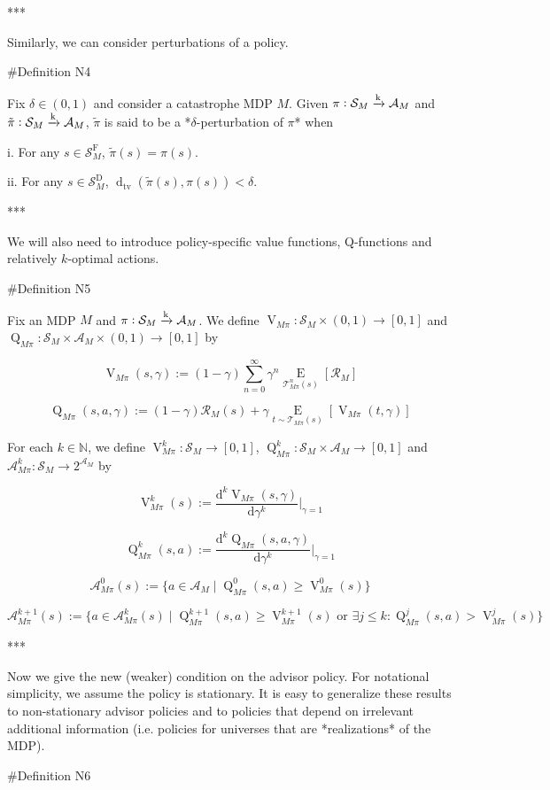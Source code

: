 \documentclass[a4paper]{article}
\newcommand{\AP}[1]{\left(#1\right)}
\newcommand{\AB}[1]{\left[#1\right]}
\newcommand{\Ea}[2]{\underset{#1}{\operatorname{E}}\AB{#2}}
\newcommand{\D}{\mathrm{d}}
\newcommand{\Dtva}[1]{\operatorname{d}_{\text{tv}}\AP{#1}}
\newcommand{\Nats}{\mathbb{N}}
\newcommand{\M}{\xrightarrow{\textnormal{k}}}
\newcommand{\A}{\mathcal{A}}
\newcommand{\St}{\mathcal{S}}
\newcommand{\T}{\mathcal{T}}
\newcommand{\R}{\mathcal{R}}
\newcommand{\SF}{\St^{\text{F}}}
\newcommand{\SD}{\St^{\text{D}}}
\newcommand{\V}{\operatorname{V}}
\newcommand{\Q}{\operatorname{Q}}
\begin{document}
***

Similarly, we can consider perturbations of a policy.

\#Definition N4

Fix $\delta\in(0,1)$ and consider a catastrophe MDP $M$. Given $\pi: \St_M \M \A_M$ and $\tilde{\pi}: \St_M \M \A_M$, $\tilde{\pi}$ is said to be a *$\delta$-perturbation of $\pi$* when

i. For any $s \in \SF_M$, $\tilde{\pi}(s) = \pi(s)$.

ii. For any $s \in \SD_M$, $\Dtva{\tilde{\pi}(s),\pi(s)} < \delta$.

***

We will also need to introduce policy-specific value functions, Q-functions and relatively $k$-optimal actions.

\#Definition N5

Fix an MDP $M$ and $\pi: \St_M \M \A_M$. We define $\V_{M\pi}: \St_M \times (0,1) \rightarrow [0,1]$ and $\Q_{M\pi}: \St_M \times \A_M \times (0,1) \rightarrow [0,1]$ by

$$\V_{M\pi}(s,\gamma) := (1-\gamma) \sum_{n=0}^\infty \gamma^n \Ea{\T_{M\pi}^n(s)}{\R_M}$$

$$\Q_{M\pi}(s,a,\gamma) := (1-\gamma) \R_M(s) + \gamma \Ea{t \sim \T_{M\pi}(s)}{\V_{M\pi}(t,\gamma)}$$

For each $k \in \Nats$, we define $\V_{M\pi}^k: \St_M \rightarrow [0,1]$, $\Q_{M\pi}^k: \St_M \times \A_M \rightarrow [0,1]$ and $\A_{M\pi}^k: \St_M \rightarrow 2^{\A_M}$ by

$$\V_{M\pi}^k(s) := \frac{\D^k \V_{M\pi}(s,\gamma)}{\D\gamma^k}\bigg\vert_{\gamma=1}$$

$$\Q_{M\pi}^k(s,a) := \frac{\D^k \Q_{M\pi}(s,a,\gamma)}{\D\gamma^k}\bigg\vert_{\gamma=1}$$

$$\A_{M\pi}^0(s) := \{a \in \A_M \mid \Q_{M\pi}^0(s,a) \geq \V_{M\pi}^0(s)\}$$

$$\A_{M\pi}^{k+1}(s) := \{a \in \A_{M\pi}^k(s) \mid \Q_{M\pi}^{k+1}(s,a) \geq \V_{M\pi}^{k+1}(s) \text{ or } \exists j \leq k: \Q_{M\pi}^{j}(s,a) > \V_{M\pi}^{j}(s)\}$$

***

Now we give the new (weaker) condition on the advisor policy. For notational simplicity, we assume the policy is stationary. It is easy to generalize these results to non-stationary advisor policies and to policies that depend on irrelevant additional information (i.e. policies for universes that are *realizations* of the MDP).

\#Definition N6
\end{document}
